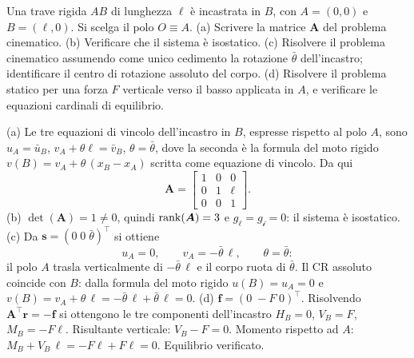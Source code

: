 \begin{esercizio}
	\label{ex:C05_mensola}
	
	Una trave rigida $AB$ di lunghezza $\ell$ è incastrata in $B$,
	con $A=(0,0)$ e $B=(\ell,0)$. Si scelga il polo $O\equiv A$.
	(a) Scrivere la matrice $\bm{A}$ del problema cinematico.
	(b) Verificare che il sistema è isostatico.
	(c) Risolvere il problema cinematico assumendo come unico
	cedimento la rotazione $\bar{\theta}$ dell'incastro;
	identificare il centro di rotazione assoluto del corpo.
	(d) Risolvere il problema statico per una forza $F$ verticale
	verso il basso applicata in $A$, e verificare le equazioni
	cardinali di equilibrio.
	
	\risultato (a) Le tre equazioni di vincolo dell'incastro in
	$B$, espresse rispetto al polo $A$, sono $u_A=\bar{u}_B$,
	$v_A+\theta\ell=\bar{v}_B$, $\theta=\bar{\theta}$, dove la
	seconda è la formula del moto rigido $v(B)=v_A+\theta\,(x_B-x_A)$
	scritta come equazione di vincolo. Da qui
	\[
	\bm{A}=
	\begin{bmatrix}
		1 & 0 & 0\\
		0 & 1 & \ell\\
		0 & 0 & 1
	\end{bmatrix}.
	\]
	(b) $\det(\bm{A})=1\neq 0$, quindi $\operatorname{rank}(\bm{A})=3$ e
	$g_\ell=g_{\mathscr{i}}=0$: il sistema è isostatico.
	(c) Da $\bm{s}=(0\;0\;\bar{\theta})^\top$ si ottiene
	\[
	u_A=0,\qquad v_A=-\bar{\theta}\,\ell,\qquad \theta=\bar{\theta}:
	\]
	il polo $A$ trasla verticalmente di $-\bar{\theta}\,\ell$ e
	il corpo ruota di $\bar{\theta}$. Il CR assoluto coincide
	con $B$: dalla formula del moto rigido
	$u(B)=u_A=0$ e
	$v(B)=v_A+\theta\,\ell=-\bar{\theta}\,\ell+\bar{\theta}\,\ell=0$.
	(d) $\bm{f}=(0\;-F\;0)^\top$. Risolvendo
	$\bm{A}^\top\bm{r}=-\bm{f}$ si ottengono le tre componenti
	dell'incastro $H_B=0$, $V_B=F$, $M_B=-F\ell$. Risultante
	verticale: $V_B-F=0$. Momento rispetto ad $A$:
	$M_B+V_B\,\ell=-F\ell+F\ell=0$. Equilibrio verificato.
\end{esercizio}





